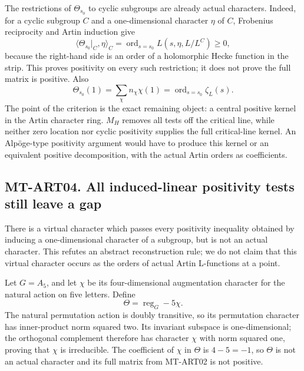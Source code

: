 \documentclass[11pt,a4paper]{article}
\begin{document}
The restrictions of $\Theta_{s_0}$ to cyclic subgroups are already actual
characters.  Indeed, for a cyclic subgroup $C$ and a one-dimensional
character $\eta$ of $C$, Frobenius reciprocity and Artin induction give
\[
 \langle\Theta_{s_0}|_C,\eta\rangle_C
   =\operatorname{ord}_{s=s_0}L(s,\eta,L/L^C)\ge0,
\]
because the right-hand side is an order of a holomorphic Hecke function in
the strip.  This proves positivity on every such restriction; it does not
prove the full matrix is positive.  Also
\[
 \Theta_{s_0}(1)=\sum_\chi n_\chi\chi(1)
   =\operatorname{ord}_{s=s_0}\zeta_L(s).
\]
The point of the criterion is the exact remaining object: a central
positive kernel in the Artin character ring.  $M_H$ removes all tests off
the critical line, while neither zero location nor cyclic positivity
supplies the full critical-line kernel.  An Alp\"oge-type positivity
argument would have to produce this kernel or an equivalent positive
decomposition, with the actual Artin orders as coefficients.

\subsection*{MT-ART04. All induced-linear positivity tests still leave a gap}
There is a virtual character which passes every positivity inequality
obtained by inducing a one-dimensional character of a subgroup, but is not
an actual character.  This refutes an abstract reconstruction rule; we do
not claim that this virtual character occurs as the orders of actual
Artin L-functions at a point.

Let $G=A_5$, and let $\chi$ be its four-dimensional augmentation character
for the natural action on five letters.  Define
\[
             \Theta=\operatorname{reg}_G-5\chi.
\]
The natural permutation action is doubly transitive, so its permutation
character has inner-product norm squared two.  Its invariant subspace is
one-dimensional; the orthogonal complement therefore has character
$\chi$ with norm squared one, proving that $\chi$ is irreducible.
The coefficient of $\chi$ in $\Theta$ is $4-5=-1$, so $\Theta$ is not an
actual character and its full matrix from MT-ART02 is not positive.
\end{document}
